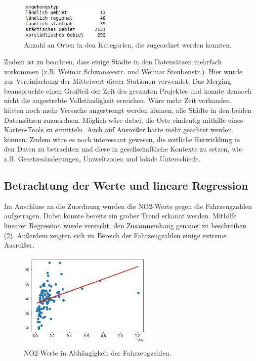 \documentclass[11pt,a4paper,oneside,german]{article}
\begin{document}
	\begin{figure}
		\vspace{-20pt}
		\begin{center}
			\includegraphics[width=4.5cm]{Kategorien.jpg}
			\caption{Anzahl an Orten in den Kategorien, die zugeordnet werden konnten.}
			\label{fig:Kategorien}
		\end{center}
		\vspace{-20pt}
	\end{figure}
	
	Zudem ist zu beachten, dass einige Städte in den Datensätzen mehrfach vorkommen (z.B. Weimar Schwanseestr. und Weimar Steubenstr.). Hier wurde zur Vereinfachung der Mittelwert dieser Stationen verwendet. Das Merging beanspruchte einen Großteil der Zeit des gesamten Projektes und konnte dennoch nicht die angestrebte Vollständigkeit erreichen. Wäre mehr Zeit vorhanden, hätten noch mehr Versuche angestrengt werden können, alle Städte in den beiden Datensätzen zuzuordnen. Möglich wäre dabei, die Orte eindeutig mithilfe eines Karten-Tools zu ermitteln. Auch auf Ausreißer hätte mehr geachtet werden können. Zudem wäre es noch interessant gewesen, die zeitliche Entwicklung in den Daten zu betrachten und diese in gesellschaftliche Kontexte zu setzen, wie z.B. Gesetzesänderungen, Umweltzonen und lokale Unterschiede.
	
	\subsection{Betrachtung der Werte und lineare Regression}
	
	Im Anschluss an die Zuordnung wurden die NO2-Werte gegen die Fahrzeugzahlen aufgetragen. Dabei konnte bereits ein grober Trend erkannt werden. Mithilfe linearer Regression wurde versucht, den Zusammenhang genauer zu beschreiben (\ref{fig:linreginsgesamt}). Außerdem zeigten sich im Bereich der Fahrzeugzahlen einige extreme Ausreißer.
	
	\begin{figure}[h!]
		\centering
		\includegraphics[width=6.5cm]{linreginsgesamt.jpg}
		\caption{NO2-Werte in Abhängigkeit der Fahrzeugzahlen.}
		\label{fig:linreginsgesamt}
	\end{figure}
	
\end{document}
